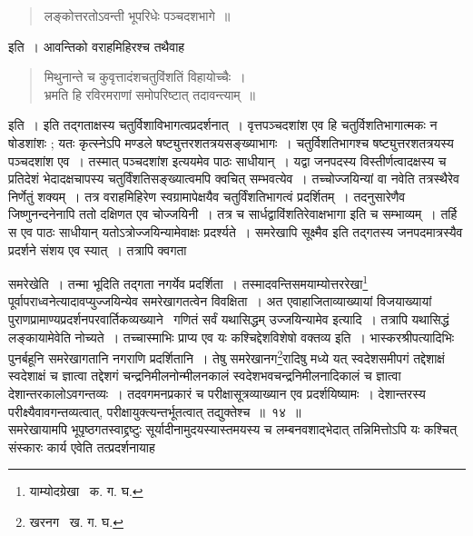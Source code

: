\documentclass[11pt, openany]{book}
\begin{document}
\begin{quote}
{\qt लङ्कोत्तरतोऽवन्ती भूपरिधेः पञ्चदशभागे~॥} 
\end{quote}

\noindent इति~। आवन्तिको वराहमिहिरश्च तथैवाह\textendash 
 
\begin{quote}
{\qt मिथुनान्ते च कुवृत्तादंशचतुविंशतिं विहायोच्चैः~।\\
 भ्रमति हि रविरमराणां समोपरिष्टात् तदावन्त्याम्~॥} 
\end{quote}

\noindent इति~। इति तद्गताक्षस्य चतुर्विशाविभागत्वप्रदर्शनात्~। वृत्तपञ्चदशांश एव हि चतुर्विशतिभागात्मकः न षोडशांशः ; यतः 
कृत्स्नेऽपि मण्डले षष्ट्युत्तरशतत्रयसङ्ख्याभागः~। चतुर्विशतिभागश्च षष्ट्युत्तरशतत्रयस्य पञ्चदशांश एव~। तस्मात् पञ्चदशांश इत्ययमेव पाठः साधीयान्~। यद्वा जनपदस्य विस्तीर्णत्वादक्षस्य च प्रतिदेशं भेदादक्षचापस्य चतुर्विंशतिसङ्ख्यात्वमपि क्वचित् सम्भवत्येव~। तच्चोज्जयिन्यां वा 
नवेति तत्रस्थैरेव निर्णेतुं शक्यम्~। तत्र वराहमिहिरेण स्वग्रामापेक्षयैव चतुर्विंशतिभागत्वं प्रदर्शितम्~। तदनुसारेणैव जिष्णुनन्दनेनापि ततो दक्षिणत एव चोज्जयिनी~। तत्र च सार्धद्वाविंशतिरेवाक्षभागा इति च सम्भाव्यम्~। तर्हि स एव पाठः साधीयान् यतोऽत्रोज्जयिन्यामेवाक्षः प्रदर्श्यते~। समरेखापि सूक्ष्मैव इति तद्गतस्य जनपदमात्रस्यैव प्रदर्शने संशय एव स्यात्~। तत्रापि क्वगता

\newpage

\noindent समरेखेति~। तन्मा भूदिति तद्गता नगर्येव प्रदर्शिता~। तस्मादवन्तिसमयाम्योत्तररेखा\renewcommand{\thefootnote}{१}\footnote{याम्योदग्रेखा \textendash\ क. ग. घ.} 
पूर्वापराध्वनेत्यादावप्युज्जयिन्येव समरेखागतत्वेन विवक्षिता~। अत एवाहाजिताव्याख्यायां विजयाख्यायां पुराणप्रामाण्यप्रदर्शनपरवार्तिकव्यख्याने \textendash\ {\qt गणितं सर्वं यथासिद्धम् उज्जयिन्यामेव} इत्यादि~। तत्रापि यथासिद्धं लङ्कायामेवेति नोच्यते~। तच्चास्माभिः प्राप्य एव यः कश्चिद्देशविशेषो वक्तव्य इति~। भास्करश्रीपत्यादिभिः पुनर्बहूनि समरेखागतानि नगराणि प्रदर्शितानि~। तेषु समरेखानग\renewcommand{\thefootnote}{२}\footnote{खरनग \textendash\ ख. ग. घ.}रादिषु मध्ये यत् स्वदेशसमीपगं तद्देशाक्षं स्वदेशाक्षं च ज्ञात्वा तद्देशगं चन्द्रनिमीलनोन्मीलनकालं स्वदेशभवचन्द्रनिमीलनादिकालं च ज्ञात्वा देशान्तरकालोऽवगन्तव्यः~। तदवगमनप्रकारं च परीक्षासूत्रव्याख्यान एव प्रदर्शयिष्यामः~। देशान्तरस्य परीक्ष्यैवावगन्तव्यत्वात्, परीक्षायुक्त्यन्तर्भूतत्वात् तद्युक्तेश्च~॥~१४~॥ \\

\indent समरेखायामपि भूपृष्ठगतस्वाद्द्रष्टुः सूर्यादीनामुदयस्यास्तमयस्य च लम्बनवशाद्भेदात् तन्निमित्तोऽपि यः कश्चित् संस्कारः कार्य एवेति तत्प्रदर्शनायाह\textendash 
\end{document}
